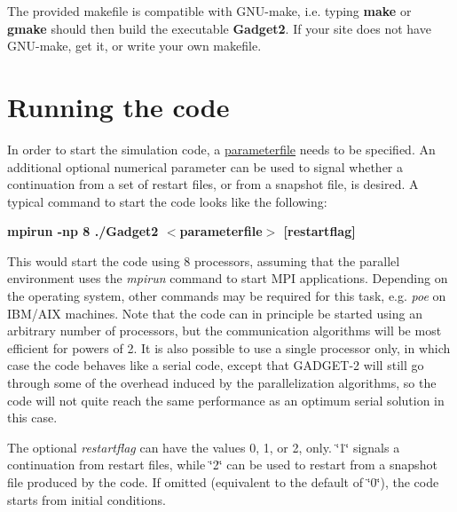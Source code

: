 The provided makefile is compatible with GNU-\/make, i.e. typing {\bfseries make} or {\bfseries gmake} should then build the executable {\bfseries Gadget2}. If your site does not have GNU-\/make, get it, or write your own makefile.\hypertarget{main_howtorun}{}\section{Running the code}\label{main_howtorun}
In order to start the simulation code, a \hyperlink{parameterfile}{parameterfile} needs to be specified. An additional optional numerical parameter can be used to signal whether a continuation from a set of restart files, or from a snapshot file, is desired. A typical command to start the code looks like the following: \par
 \par


{\bfseries  mpirun -\/np 8 ./Gadget2 $<$parameterfile$>$ \mbox{[}restartflag\mbox{]}} \par
 \par


This would start the code using 8 processors, assuming that the parallel environment uses the {\itshape mpirun\/} command to start MPI applications. Depending on the operating system, other commands may be required for this task, e.g. {\itshape poe\/} on IBM/AIX machines. Note that the code can in principle be started using an arbitrary number of processors, but the communication algorithms will be most efficient for powers of 2. It is also possible to use a single processor only, in which case the code behaves like a serial code, except that GADGET-\/2 will still go through some of the overhead induced by the parallelization algorithms, so the code will not quite reach the same performance as an optimum serial solution in this case.

The optional {\itshape restartflag\/} can have the values 0, 1, or 2, only. \char`\"{}1\char`\"{} signals a continuation from restart files, while \char`\"{}2\char`\"{} can be used to restart from a snapshot file produced by the code. If omitted (equivalent to the default of \char`\"{}0\char`\"{}), the code starts from initial conditions. 